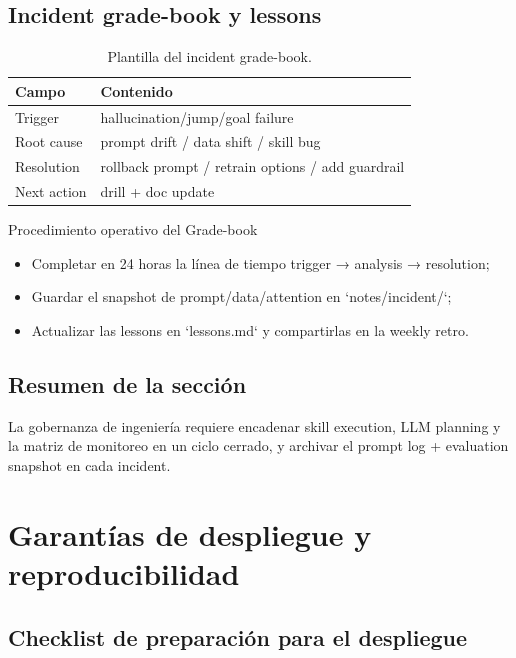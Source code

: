 \documentclass[a4paper]{article}
\begin{document}
\subsection{Incident grade-book y lessons}

\begin{table}[H]
\centering
\begin{tabular}{p{4cm}p{6cm}}
\toprule
Campo & Contenido \\
\midrule
Trigger & hallucination/jump/goal failure \\
Root cause & prompt drift / data shift / skill bug \\
Resolution & rollback prompt / retrain options / add guardrail \\
Next action & drill + doc update \\
\bottomrule
\end{tabular}
\caption{Plantilla del incident grade-book.}
\end{table}

\begin{importantbox}{Procedimiento operativo del Grade-book}
\begin{itemize}
    \item Completar en 24 horas la línea de tiempo trigger → analysis → resolution;
    \item Guardar el snapshot de prompt/data/attention en `notes/incident/`;
    \item Actualizar las lessons en `lessons.md` y compartirlas en la weekly retro.
\end{itemize}
\end{importantbox}

\subsection{Resumen de la sección}

La gobernanza de ingeniería requiere encadenar skill execution, LLM planning y la matriz de monitoreo en un ciclo cerrado, y archivar el prompt log + evaluation snapshot en cada incident.
\section{Garantías de despliegue y reproducibilidad}

\subsection{Checklist de preparación para el despliegue}
\end{document}
